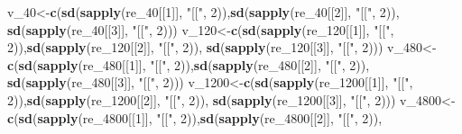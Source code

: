 \documentclass[
]{article}
\newenvironment{Shaded}{\begin{snugshade}}{\end{snugshade}}
\newcommand{\DecValTok}[1]{\textcolor[rgb]{0.00,0.00,0.81}{#1}}
\newcommand{\KeywordTok}[1]{\textcolor[rgb]{0.13,0.29,0.53}{\textbf{#1}}}
\newcommand{\NormalTok}[1]{#1}
\newcommand{\StringTok}[1]{\textcolor[rgb]{0.31,0.60,0.02}{#1}}
\begin{document}
\begin{Shaded}
\begin{Highlighting}[]
\NormalTok{v_}\DecValTok{40}\NormalTok{<-}\KeywordTok{c}\NormalTok{(}\KeywordTok{sd}\NormalTok{(}\KeywordTok{sapply}\NormalTok{(re_}\DecValTok{40}\NormalTok{[[}\DecValTok{1}\NormalTok{]], }\StringTok{"[["}\NormalTok{, }\DecValTok{2}\NormalTok{)),}\KeywordTok{sd}\NormalTok{(}\KeywordTok{sapply}\NormalTok{(re_}\DecValTok{40}\NormalTok{[[}\DecValTok{2}\NormalTok{]], }\StringTok{"[["}\NormalTok{, }\DecValTok{2}\NormalTok{)),}
        \KeywordTok{sd}\NormalTok{(}\KeywordTok{sapply}\NormalTok{(re_}\DecValTok{40}\NormalTok{[[}\DecValTok{3}\NormalTok{]], }\StringTok{"[["}\NormalTok{, }\DecValTok{2}\NormalTok{)))}
\NormalTok{v_}\DecValTok{120}\NormalTok{<-}\KeywordTok{c}\NormalTok{(}\KeywordTok{sd}\NormalTok{(}\KeywordTok{sapply}\NormalTok{(re_}\DecValTok{120}\NormalTok{[[}\DecValTok{1}\NormalTok{]], }\StringTok{"[["}\NormalTok{, }\DecValTok{2}\NormalTok{)),}\KeywordTok{sd}\NormalTok{(}\KeywordTok{sapply}\NormalTok{(re_}\DecValTok{120}\NormalTok{[[}\DecValTok{2}\NormalTok{]], }\StringTok{"[["}\NormalTok{, }\DecValTok{2}\NormalTok{)),}
        \KeywordTok{sd}\NormalTok{(}\KeywordTok{sapply}\NormalTok{(re_}\DecValTok{120}\NormalTok{[[}\DecValTok{3}\NormalTok{]], }\StringTok{"[["}\NormalTok{, }\DecValTok{2}\NormalTok{)))}
\NormalTok{v_}\DecValTok{480}\NormalTok{<-}\KeywordTok{c}\NormalTok{(}\KeywordTok{sd}\NormalTok{(}\KeywordTok{sapply}\NormalTok{(re_}\DecValTok{480}\NormalTok{[[}\DecValTok{1}\NormalTok{]], }\StringTok{"[["}\NormalTok{, }\DecValTok{2}\NormalTok{)),}\KeywordTok{sd}\NormalTok{(}\KeywordTok{sapply}\NormalTok{(re_}\DecValTok{480}\NormalTok{[[}\DecValTok{2}\NormalTok{]], }\StringTok{"[["}\NormalTok{, }\DecValTok{2}\NormalTok{)),}
        \KeywordTok{sd}\NormalTok{(}\KeywordTok{sapply}\NormalTok{(re_}\DecValTok{480}\NormalTok{[[}\DecValTok{3}\NormalTok{]], }\StringTok{"[["}\NormalTok{, }\DecValTok{2}\NormalTok{)))}
\NormalTok{v_}\DecValTok{1200}\NormalTok{<-}\KeywordTok{c}\NormalTok{(}\KeywordTok{sd}\NormalTok{(}\KeywordTok{sapply}\NormalTok{(re_}\DecValTok{1200}\NormalTok{[[}\DecValTok{1}\NormalTok{]], }\StringTok{"[["}\NormalTok{, }\DecValTok{2}\NormalTok{)),}\KeywordTok{sd}\NormalTok{(}\KeywordTok{sapply}\NormalTok{(re_}\DecValTok{1200}\NormalTok{[[}\DecValTok{2}\NormalTok{]], }\StringTok{"[["}\NormalTok{, }\DecValTok{2}\NormalTok{)),}
        \KeywordTok{sd}\NormalTok{(}\KeywordTok{sapply}\NormalTok{(re_}\DecValTok{1200}\NormalTok{[[}\DecValTok{3}\NormalTok{]], }\StringTok{"[["}\NormalTok{, }\DecValTok{2}\NormalTok{)))}
\NormalTok{v_}\DecValTok{4800}\NormalTok{<-}\KeywordTok{c}\NormalTok{(}\KeywordTok{sd}\NormalTok{(}\KeywordTok{sapply}\NormalTok{(re_}\DecValTok{4800}\NormalTok{[[}\DecValTok{1}\NormalTok{]], }\StringTok{"[["}\NormalTok{, }\DecValTok{2}\NormalTok{)),}\KeywordTok{sd}\NormalTok{(}\KeywordTok{sapply}\NormalTok{(re_}\DecValTok{4800}\NormalTok{[[}\DecValTok{2}\NormalTok{]], }\StringTok{"[["}\NormalTok{, }\DecValTok{2}\NormalTok{)),}

\end{Highlighting}
\end{Shaded}
\end{document}
